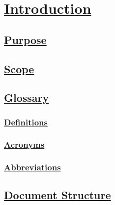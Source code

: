 \section[Introduction]{\hyperlink{toc}{Introduction}}
	\label{sec:introduction}
	
	\subsection[Purpose]{\hyperlink{toc}{Purpose}}
		\label{sec:purpose}
		
	\subsection[Scope]{\hyperlink{toc}{Scope}}
		\label{sec:scope}
		
	\subsection[Glossary]{\hyperlink{toc}{Glossary}}
		\label{sec:glossary}
		\subsubsection[Definitions]{\hyperlink{toc}{Definitions}}
		\subsubsection[Acronyms]{\hyperlink{toc}{Acronyms}}
		\subsubsection[Abbreviations]{\hyperlink{toc}{Abbreviations}}
		
	\subsection[Document Structure]{\hyperlink{toc}{Document Structure}}
		\label{sec:documentStructure}			